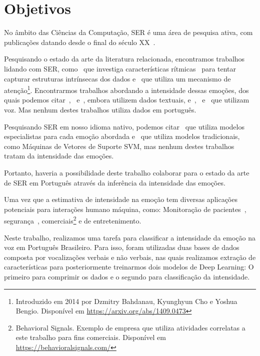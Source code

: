 \section{Objetivos}

No âmbito das Ciências da Computação, \acrshort{SER} é uma área de pesquisa ativa, com publicações datando desde o final do século XX~\cite{12.27}.

Pesquisando o estado da arte da literatura relacionada, encontramos trabalhos lidando com \acrshort{SER}, como~\cite{11} que investiga características rítmicas~\cite{34} para tentar capturar estruturas intrínsecas dos dados e~\cite{32.95} que utiliza um mecanismo de atenção\footnote{Introduzido em 2014 por Dzmitry Bahdanau, Kyunghyun Cho e Yoshua Bengio. Disponível em \url{https://arxiv.org/abs/1409.0473}}. Encontrarmos trabalhos abordando a intensidade dessas emoções, dos quais podemos citar~\cite{14},~\cite{15} e~\cite{28}, embora utilizem dados textuais, e~\cite{3},~\cite{18} e~\cite{20} que utilizam voz. Mas nenhum destes trabalhos utiliza dados em português.

Pesquisando \acrshort{SER} em nosso idioma nativo, podemos citar~\cite{12} que utiliza modelos especialistas para cada emoção abordada e~\cite{21} que utiliza modelos tradicionais, como Máquinas de Vetores de Suporte \acrfull{SVM}, mas nenhum destes trabalhos tratam da intensidade das emoções.

Portanto, haveria a possibilidade deste trabalho colaborar para o estado da arte de \acrshort{SER} em Português através da inferência da intensidade das emoções.

Uma vez que a estimativa de intensidade na emoção tem diversas aplicações potenciais para interações humano máquina, como: Monitoração de pacientes~\cite{1}, segurança~\cite{4}, comerciais\footnote{Behavioral Signals. Exemplo de empresa que utiliza atividades correlatas a este trabalho para fins comerciais. Disponível em \url{https://behavioralsignals.com/}} e de entretenimento.

Neste trabalho, realizamos uma tarefa para classificar a intensidade da emoção na voz em Português Brasileiro. Para isso, foram utilizadas duas bases de dados composta por vocalizações verbais e não verbais, nas quais realizamos extração de características para posteriormente treinarmos dois modelos de \acrshort{Deep Learning}: O primeiro para comprimir os dados e o segundo para classificação da intensidade.


